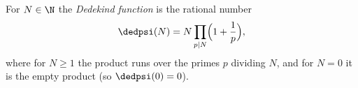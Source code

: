For $N\in\N$ the \emph{Dedekind function} is the rational number
\[
  \dedpsi(N)=N\prod_{p\mid N}\Bigl(1+\frac1p\Bigr),
\]
where for $N\ge1$ the product runs over the primes $p$ dividing $N$, and for $N=0$ it is the empty product (so $\dedpsi(0)=0$).
